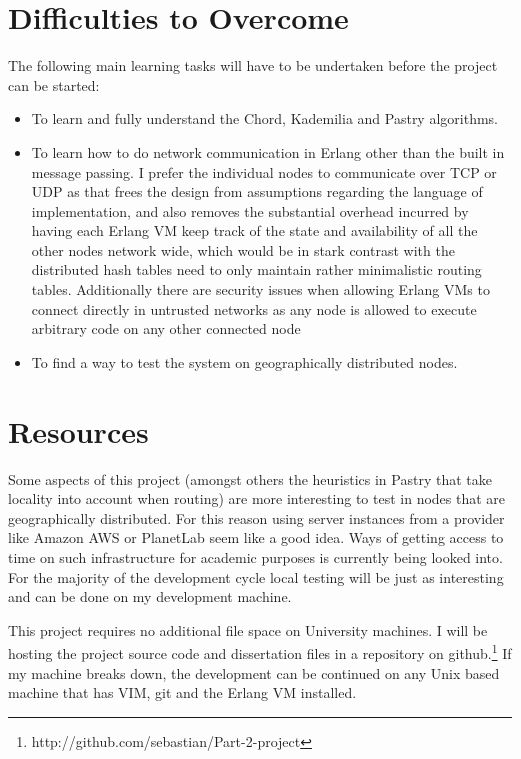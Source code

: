 \section*{Difficulties to Overcome}

The following main learning tasks will have to be undertaken before 
the project can be started:

\begin{itemize}

\item To learn and fully understand the Chord, Kademilia and Pastry algorithms.

\item To learn how to do network communication in Erlang other than the built in message passing. I prefer the individual nodes to communicate over TCP or UDP as that frees the design from assumptions regarding the language of implementation, and also removes the substantial overhead incurred by having each Erlang VM keep track of the state and availability of all the other nodes network wide, which would be in stark contrast with the distributed hash tables need to only maintain rather minimalistic routing tables. Additionally there are security issues when allowing Erlang VMs to connect directly in untrusted networks as any node is allowed to execute arbitrary code on any other connected node

\item To find a way to test the system on geographically distributed nodes.

\end{itemize}


\section*{Resources}

Some aspects of this project (amongst others the heuristics in Pastry that take locality into account when routing) are more interesting to test in nodes that are geographically distributed. For this reason using server instances from a provider like Amazon AWS or PlanetLab seem like a good idea. Ways of getting access to time on such infrastructure for academic purposes is currently being looked into. For the majority of the development cycle local testing will be just as interesting and can be done on my development machine.

This project requires no additional file space on University machines. I will be hosting the project source code and dissertation files in a repository on github.\footnote{http://github.com/sebastian/Part-2-project}
If my machine breaks down, the development can be continued on any Unix based machine that has VIM, git and the Erlang VM installed.

